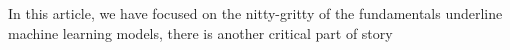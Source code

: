 In this article, we have focused on the nitty-gritty of the fundamentals underline machine learning models, there is another critical part of story  